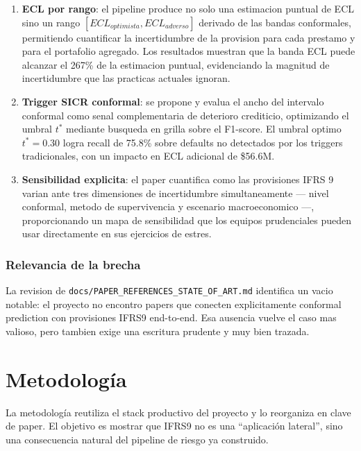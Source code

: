 \documentclass[
  spanish,
  11pt,
  letterpaper,
]{scrbook}
\providecommand{\tightlist}{%
  \setlength{\itemsep}{0pt}\setlength{\parskip}{0pt}}
\theoremstyle{plain}
\theoremstyle{remark}
\begin{document}
\begin{enumerate}
\def\labelenumi{\arabic{enumi}.}
\tightlist
\item
  \textbf{ECL por rango}: el pipeline produce no solo una estimacion
  puntual de ECL sino un rango \([ECL_{optimista}, ECL_{adverso}]\)
  derivado de las bandas conformales, permitiendo cuantificar la
  incertidumbre de la provision para cada prestamo y para el portafolio
  agregado. Los resultados muestran que la banda ECL puede alcanzar el
  267\% de la estimacion puntual, evidenciando la magnitud de
  incertidumbre que las practicas actuales ignoran.
\item
  \textbf{Trigger SICR conformal}: se propone y evalua el ancho del
  intervalo conformal como senal complementaria de deterioro crediticio,
  optimizando el umbral \(t^*\) mediante busqueda en grilla sobre el
  F1-score. El umbral optimo \(t^* = 0.30\) logra recall de 75.8\% sobre
  defaults no detectados por los triggers tradicionales, con un impacto
  en ECL adicional de \$56.6M.
\item
  \textbf{Sensibilidad explicita}: el paper cuantifica como las
  provisiones IFRS 9 varian ante tres dimensiones de incertidumbre
  simultaneamente --- nivel conformal, metodo de supervivencia y
  escenario macroeconomico ---, proporcionando un mapa de sensibilidad
  que los equipos prudenciales pueden usar directamente en sus
  ejercicios de estres.
\end{enumerate}

\subsection{Relevancia de la brecha}\label{relevancia-de-la-brecha}

La revision de \texttt{docs/PAPER\_REFERENCES\_STATE\_OF\_ART.md}
identifica un vacio notable: el proyecto no encontro papers que conecten
explicitamente conformal prediction con provisiones IFRS9 end-to-end.
Esa ausencia vuelve el caso mas valioso, pero tambien exige una
escritura prudente y muy bien trazada.

\chapter{Metodología}\label{sec-p2-methodology}

La metodología reutiliza el stack productivo del proyecto y lo
reorganiza en clave de paper. El objetivo es mostrar que IFRS9 no es una
``aplicación lateral'', sino una consecuencia natural del pipeline de
riesgo ya construido.
\end{document}
